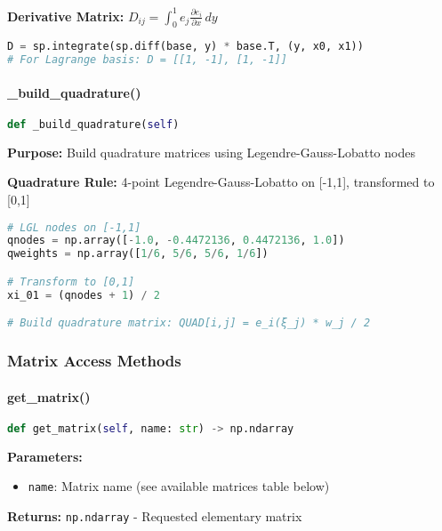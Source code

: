 \textbf{Derivative Matrix:} $D_{ij} = \int_0^1 e_j \frac{\partial e_i}{\partial x} \, dy$
\begin{lstlisting}[language=Python, caption=Derivative Matrix Computation]
D = sp.integrate(sp.diff(base, y) * base.T, (y, x0, x1))
# For Lagrange basis: D = [[1, -1], [1, -1]]
\end{lstlisting}

\paragraph{\_build\_quadrature()}\leavevmode
\begin{lstlisting}[language=Python, caption=Build Quadrature Method]
def _build_quadrature(self)
\end{lstlisting}

\textbf{Purpose:} Build quadrature matrices using Legendre-Gauss-Lobatto nodes

\textbf{Quadrature Rule:} 4-point Legendre-Gauss-Lobatto on [-1,1], transformed to [0,1]
\begin{lstlisting}[language=Python, caption=Quadrature Setup]
# LGL nodes on [-1,1]
qnodes = np.array([-1.0, -0.4472136, 0.4472136, 1.0])
qweights = np.array([1/6, 5/6, 5/6, 1/6])

# Transform to [0,1]
xi_01 = (qnodes + 1) / 2

# Build quadrature matrix: QUAD[i,j] = e_i(ξ_j) * w_j / 2
\end{lstlisting}

\subsubsection{Matrix Access Methods}

\paragraph{get\_matrix()}\leavevmode
\begin{lstlisting}[language=Python, caption=Get Matrix Method]
def get_matrix(self, name: str) -> np.ndarray
\end{lstlisting}

\textbf{Parameters:}
\begin{itemize}
    \item \texttt{name}: Matrix name (see available matrices table below)
\end{itemize}

\textbf{Returns:} \texttt{np.ndarray} - Requested elementary matrix

